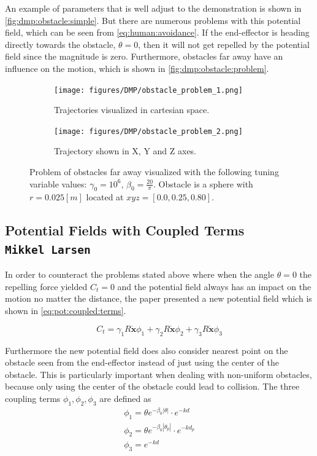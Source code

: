 \documentclass[../main.tex]{subfiles}
\begin{document}
An example of parameters that is well adjust to the demonstration is shown in \autoref{fig:dmp:obstacle:simple}. But there are numerous problems with this potential field, which can be seen from \autoref{eq:human:avoidance}. If the end-effector is heading directly towards the obstacle, $\theta = 0$, then it will not get repelled by the potential field since the magnitude is zero. Furthermore, obstacles far away have an influence on the motion, which is shown in \autoref{fig:dmp:obstacle:problem}. 

\begin{figure}[H]
    \centering
    \begin{subfigure}[b]{0.48\textwidth}
        \centering
        \texttt{[image: figures/DMP/obstacle\_problem\_1.png]}
        \caption{Trajectories visualized in cartesian space.}
        \label{fig:dmp:obstacle:problem:1}
    \end{subfigure}
    \hfill
    \begin{subfigure}[b]{0.48\textwidth}
        \centering
        \texttt{[image: figures/DMP/obstacle\_problem\_2.png]}
        \caption{Trajectory shown in X, Y and Z axes.}
        \label{fig:dmp:obstacle:problem:2}
    \end{subfigure}
    \caption{Problem of obstacles far away visualized with the following tuning variable values: $\gamma_0 = 10^6$, $\beta_0 = \frac{20}{\pi}$. Obstacle is a sphere with $r=0.025[m]$ located at  $xyz=[0.0, 0.25, 0.80]$.}
    \label{fig:dmp:obstacle:problem}
\end{figure}

\subsection{Potential Fields with Coupled Terms \\ \normalfont\normalsize\texttt{Mikkel Larsen}}
In order to counteract the problems stated above where when the angle $\theta=0$ the repelling force yielded $C_t=0$ and the potential field always has an impact on the motion no matter the distance, the paper \cite{rai_learning_2014} presented a new potential field which is shown in \autoref{eq:pot:coupled:terms}. 

\begin{equation} \label{eq:pot:coupled:terms}
     C_t = \gamma_1 R \dot{\boldsymbol{x}}\phi_1 +  \gamma_2 R \dot{\boldsymbol{x}}\phi_2 +  \gamma_3 R \dot{\boldsymbol{x}}\phi_3
\end{equation}

Furthermore the new potential field does also consider nearest point on the obstacle seen from the end-effector instead of just using the center of the obstacle. This is particularly important when dealing with non-uniform obstacles, because only using the center of the obstacle could lead to collision. The three coupling terms $\phi_1, \phi_2, \phi_3$ are defined as
\begin{align}
    \phi_1 = \theta e^{-\beta_0 |\theta|} \cdot e^{-kd} \\
    \phi_2 = \theta e^{-\beta_0 |\theta_p|} \cdot e^{-kd_p} \\
    \phi_3 =  e^{-kd} 
\end{align}
\end{document}
